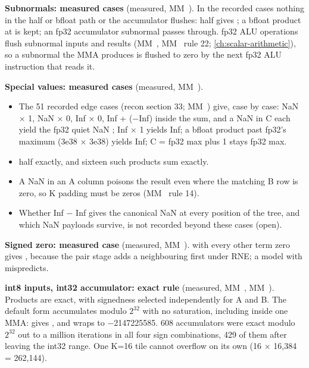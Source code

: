 \textbf{Subnormals: measured cases} (measured, MM~). In the recorded cases nothing in the half or bfloat path or the accumulator flushes: half
 gives ; a bfloat product at  is kept; an fp32 accumulator subnormal passes through. fp32
ALU operations flush subnormal inputs and results (MM~, MM~ rule 22; \cref{ch:scalar-arithmetic}), so a subnormal
the MMA produces is flushed to zero by the next fp32 ALU instruction that reads it.

\textbf{Special values: measured cases} (measured, MM~).

\begin{itemize}
\item The 51 recorded edge cases (recon section 33; MM~) give, case by case: NaN × 1, NaN × 0, Inf × 0, Inf + (−Inf)
  inside the sum, and a NaN in C each yield the fp32 quiet NaN ; Inf × 1 yields Inf; a bfloat product past
  fp32's maximum (3e38 × 3e38) yields Inf; C = fp32 max plus 1 stays fp32 max.
\item half  exactly, and sixteen such products sum exactly.
\item A NaN in an A column poisons the result even where the matching B row is zero, so K padding must be zeros
  (MM~ rule 14).
\item Whether Inf − Inf gives the canonical NaN at every position of the tree, and which NaN payloads survive, is not
  recorded beyond these cases (open).
\end{itemize}

\textbf{Signed zero: measured case} (measured, MM~).  with every other term zero gives , because the pair
stage adds a neighbouring  first under RNE; a model with  mispredicts.

\textbf{int8 inputs, int32 accumulator: exact rule} (measured, MM~, MM~). Products are exact, with signedness selected
independently for A and B. The default form accumulates modulo $2^{32}$ with no saturation, including inside one MMA:
 gives , and  wraps to −2147225585. 608 accumulators were exact modulo $2^{32}$ out
to a million iterations in all four sign combinations, 429 of them after leaving the int32 range. One K=16 tile cannot
overflow on its own (16 × 16,384 = 262,144).

